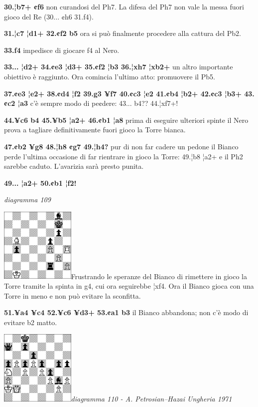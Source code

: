 \documentclass[
]{article}
\begin{document}
\textbf{30.¦b7+ ¢f6} non curandosi del Ph7. La difesa del Ph7 non vale
la messa fuori gioco del Re (30... ¢h6 31.f4).

\textbf{31.¦c7 ¦d1+ 32.¢f2 b5} ora si può finalmente procedere alla
cattura del Pb2.

\textbf{33.f4} impedisce di giocare f4 al Nero.

\textbf{33... ¦d2+ 34.¢e3 ¦d3+ 35.¢f2 ¦b3 36.¦xh7 ¦xb2+} un altro
importante obiettivo è raggiunto. Ora comincia l'ultimo atto: promuovere
il Pb5.

\textbf{37.¢e3 ¦e2+ 38.¢d4 ¦f2 39.g3 ¥f7 40.¢c3 ¦e2 41.¢b4 ¦b2+ 42.¢c3
¦b3+ 43.¢c2 ¦a3} c'è sempre modo di pe¢dere: 43... b4?? 44.¦xf7+!

\textbf{44.¥c6 b4 45.¥b5 ¦a2+ 46.¢b1 ¦a8} prima di eseguire ulteriori
spinte il Nero prova a tagliare definitivamente fuori gioco la Torre
bianca.

\textbf{47.¢b2 ¥g8 48.¦h8 ¢g7 49.¦h4?} pur di non far cadere un pedone
il Bianco perde l'ultima occasione di far rientrare in gioco la Torre:
49.¦b8 ¦a2+ e il Ph2 sarebbe caduto. L'avarizia sarà presto punita.

\textbf{49... ¦a2+ 50.¢b1 ¦f2!}

\emph{diagramma 109}

\includegraphics[width=1.40139in,height=1.40139in]{vertopal_109f12be458a423d8f3cc838880eaea2/media/image109.png}Frustrando
le speranze del Bianco di rimettere in gioco la Torre tramite la spinta
in g4, cui ora seguirebbe ¦xf4. Ora il Bianco gioca con una Torre in
meno e non può evitare la sconfitta.

\textbf{51.¥a4 ¥c4 52.¥c6 ¥d3+ 53.¢a1 b3} il Bianco abbandona; non c'è
modo di evitare b2 matto.

\includegraphics[width=1.40139in,height=1.40139in]{vertopal_109f12be458a423d8f3cc838880eaea2/media/image110.png}\emph{diagramma
110 - A. Petrosian--Hazai Ungheria 1971}
\end{document}
